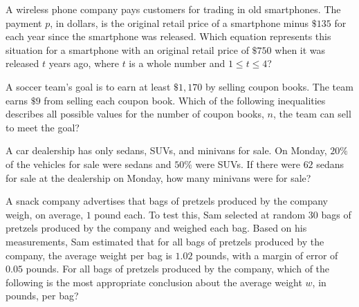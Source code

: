 \noindent\markforreview
\vspace{1em}

A wireless phone company pays customers for trading in old smartphones. The payment \(p\), in dollars, is the original retail price of a smartphone minus \(\$135\) for each year since the smartphone was released.
Which equation represents this situation for a smartphone with an original retail price of \(\$750\) when it was released \(t\) years ago, where \(t\) is a whole number and \(1 \le t \le 4\)?

\vspace{0.75em}


\vspace{2em}
\newpage

\noindent\markforreview
\vspace{1em}

A soccer team's goal is to earn at least \(\$1{,}170\) by selling coupon books. The team earns \(\$9\) from selling each coupon book. Which of the following inequalities describes all possible values for the number of coupon books, \(n\), the team can sell to meet the goal?

\vspace{0.75em}


\vspace{2em}
\newpage

\noindent\markforreview
\vspace{1em}

A car dealership has only sedans, SUVs, and minivans for sale. On Monday, \(20\%\) of the vehicles for sale were sedans and \(50\%\) were SUVs. If there were \(62\) sedans for sale at the dealership on Monday, how many minivans were for sale?

\vspace{2em}
\newpage

\noindent\markforreview
\vspace{1em}

A snack company advertises that bags of pretzels produced by the company weigh, on average, \(1\) pound each.
To test this, Sam selected at random \(30\) bags of pretzels produced by the company and weighed each bag.
Based on his measurements, Sam estimated that for all bags of pretzels produced by the company, the average weight per bag is \(1.02\) pounds, with a margin of error of \(0.05\) pounds.
For all bags of pretzels produced by the company, which of the following is the most appropriate conclusion about the average weight \(w\), in pounds, per bag?

